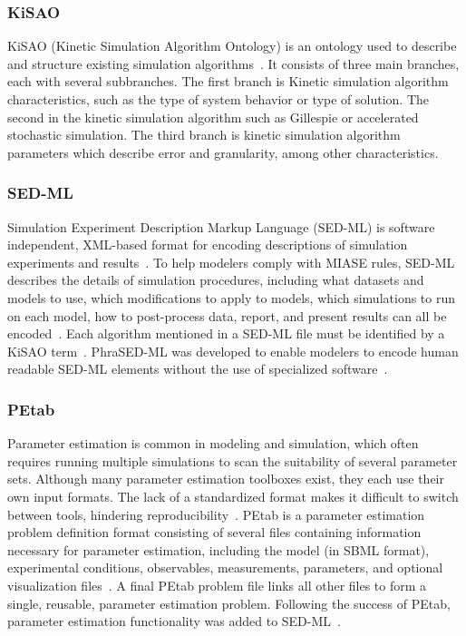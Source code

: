 \documentclass[12pt]{report}
\begin{document}
\subsubsection{KiSAO}
KiSAO (Kinetic Simulation Algorithm Ontology) is an ontology used to describe and structure existing simulation algorithms~\cite{Zhukova2011, Curtout2011}. It consists of three main branches, each with several subbranches. The first branch is Kinetic simulation algorithm characteristics, such as the type of system behavior or type of solution. The second in the kinetic simulation algorithm such as Gillespie or accelerated stochastic simulation. The third branch is kinetic simulation algorithm parameters which describe error and granularity, among other characteristics. 

\subsubsection{SED-ML}
Simulation Experiment Description Markup Language (SED-ML) is software independent, XML-based format for encoding descriptions of simulation experiments and results~\cite{bergmann_simulation_2018, Smith2021simulation}. To help modelers comply with MIASE rules, SED-ML describes the details of simulation procedures, including what datasets and models to use, which modifications to apply to models, which simulations to run on each model, how to post-process data, report, and present results can all be encoded~\cite{waltemath_minimum_2011}. Each algorithm mentioned in a SED-ML file must be identified by a KiSAO term~\cite{Curtout2011}. PhraSED-ML was developed to enable modelers to encode human readable SED-ML elements without the use of specialized software~\cite{choi_phrased-ml_2016}.

\subsubsection{PEtab}
Parameter estimation is common in modeling and simulation, which often requires running multiple simulations to scan the suitability of several parameter sets.  Although many parameter estimation toolboxes exist, they each use their own input formats. The lack of a standardized format makes it difficult to switch between tools, hindering reproducibility~\cite{Schmiester2021}.  PEtab is a parameter estimation problem definition format consisting of several files containing information necessary for parameter estimation, including the model (in SBML format), experimental conditions, observables, measurements, parameters, and optional visualization files~\cite{Schmiester2021}. A final PEtab problem file links all other files to form a single, reusable, parameter estimation problem. Following the success of PEtab, parameter estimation functionality was added to SED-ML~\cite{Smith2021simulation}.
\end{document}
